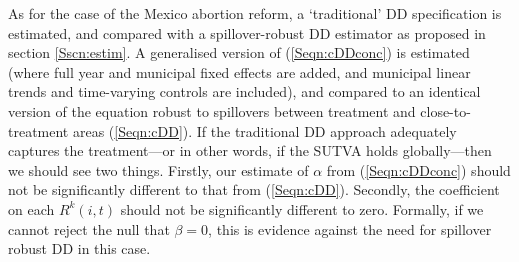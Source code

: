 As for the case of the Mexico abortion reform, a `traditional' DD specification
is estimated, and compared with a spillover-robust DD estimator as proposed in
section \ref{Sscn:estim}.  A generalised version of (\ref{Seqn:cDDconc}) is 
estimated (where full year and municipal fixed effects are added, and municipal 
linear trends and time-varying controls are included), and compared to an 
identical version of the equation robust to spillovers between treatment and 
close-to-treatment areas (\ref{Seqn:cDD}).  If the traditional DD approach 
adequately captures the treatment---or in other words, if the SUTVA holds 
globally---then we should see two things. Firstly, our estimate of $\alpha$ 
from (\ref{Seqn:cDDconc}) should not be significantly different to that from 
(\ref{Seqn:cDD}). Secondly, the coefficient on each $R^k(i,t)$ should not be 
significantly different to zero.  Formally, if we cannot reject the null that 
$\beta=0$, this is evidence against the need for spillover robust DD in this 
case.




